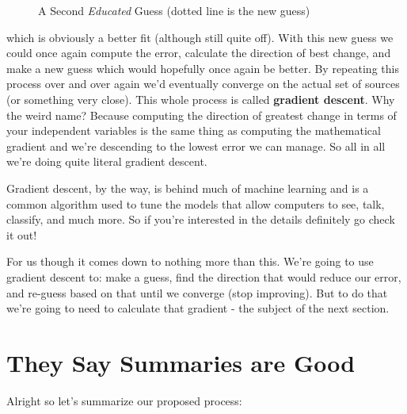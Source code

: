 \documentclass[12pt,a6paper]{book}
\begin{document}
\begin{figure}[!htb]
\caption{\label{fig:my-label} A Second \textit{Educated} Guess (dotted line is the new guess)}
\end{figure}

which is obviously a better fit (although still quite off). With this new guess we could once again compute the error, calculate the direction of best change, and make a new guess which would hopefully once again be better. By repeating this process over and over again we'd eventually converge on the actual set of sources (or something very close). This whole process is called \textbf{gradient descent}. Why the weird name? Because computing the direction of greatest change in terms of your independent variables is the same thing as computing the mathematical gradient and we're descending to the lowest error we can manage. So all in all we're doing quite literal gradient descent. 

Gradient descent, by the way, is behind much of machine learning and is a common algorithm used to tune the models that allow computers to see, talk, classify, and much more. So if you're interested in the details definitely go check it out!

For us though it comes down to nothing more than this. We're going to use gradient descent to: make a guess, find the direction that would reduce our error, and re-guess based on that until we converge (stop improving). But to do that we're going to need to calculate that gradient - the subject of the next section.

\section{They Say Summaries are Good}
Alright so let's summarize our proposed process:
\end{document}
